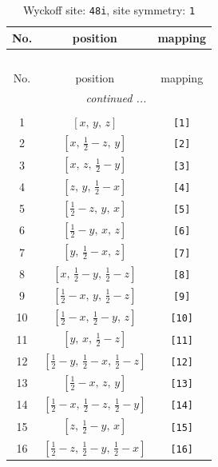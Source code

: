 \documentclass[fleqn,8pt]{jsarticle}
\begin{document}
\begin{longtable}{ccc}
\caption{Wyckoff site: {\tt 48i}, site symmetry: {\tt 1}}
 \\
 \hline \hline
No. & position & mapping \\ \hline \endfirsthead

\multicolumn{2}{l}{\tablename\ \thetable{}} \\
 \hline \hline
No. & position & mapping \\ \hline \endhead

 \hline \hline
\multicolumn{2}{r}{\footnotesize\it continued ...} \\ \endfoot

 \hline \hline
\multicolumn{2}{r}{} \\ \endlastfoot

1 & $\left[ x,\, y,\, z \right]$ & {\tt [1]} \\ \hline
2 & $\left[ x,\, \frac{1}{2} - z,\, y \right]$ & {\tt [2]} \\ \hline
3 & $\left[ x,\, z,\, \frac{1}{2} - y \right]$ & {\tt [3]} \\ \hline
4 & $\left[ z,\, y,\, \frac{1}{2} - x \right]$ & {\tt [4]} \\ \hline
5 & $\left[ \frac{1}{2} - z,\, y,\, x \right]$ & {\tt [5]} \\ \hline
6 & $\left[ \frac{1}{2} - y,\, x,\, z \right]$ & {\tt [6]} \\ \hline
7 & $\left[ y,\, \frac{1}{2} - x,\, z \right]$ & {\tt [7]} \\ \hline
8 & $\left[ x,\, \frac{1}{2} - y,\, \frac{1}{2} - z \right]$ & {\tt [8]} \\ \hline
9 & $\left[ \frac{1}{2} - x,\, y,\, \frac{1}{2} - z \right]$ & {\tt [9]} \\ \hline
10 & $\left[ \frac{1}{2} - x,\, \frac{1}{2} - y,\, z \right]$ & {\tt [10]} \\ \hline
11 & $\left[ y,\, x,\, \frac{1}{2} - z \right]$ & {\tt [11]} \\ \hline
12 & $\left[ \frac{1}{2} - y,\, \frac{1}{2} - x,\, \frac{1}{2} - z \right]$ & {\tt [12]} \\ \hline
13 & $\left[ \frac{1}{2} - x,\, z,\, y \right]$ & {\tt [13]} \\ \hline
14 & $\left[ \frac{1}{2} - x,\, \frac{1}{2} - z,\, \frac{1}{2} - y \right]$ & {\tt [14]} \\ \hline
15 & $\left[ z,\, \frac{1}{2} - y,\, x \right]$ & {\tt [15]} \\ \hline
16 & $\left[ \frac{1}{2} - z,\, \frac{1}{2} - y,\, \frac{1}{2} - x \right]$ & {\tt [16]} \\ \hline

\end{longtable}
\end{document}
